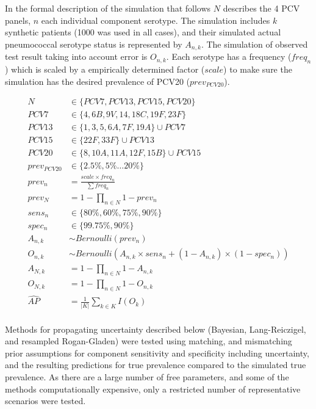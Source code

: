 \documentclass[a4paper, 12pt, twoside]{article}
\begin{document}
In the formal description of the simulation that follows \(N\) describes the 4 PCV panels, \(n\) each individual component serotype. The simulation includes \(k\) synthetic patients (1000 was used in all cases), and their simulated actual pneumococcal serotype status is represented by \(A_{n,k}\). The simulation of observed test result taking into account error is \(O_{n,k}\). Each serotype has a frequency (\(freq_n\)) which is scaled by a empirically determined factor (\(scale\)) to make sure the simulation has the desired prevalence of PCV20 (\(prev_{PCV20}\)).

\begin{equation*}
\begin{aligned}
N &\in \{PCV7, PCV13, PCV15, PCV20\} \\
PCV7 &\in \{4, 6B, 9V, 14, 18C, 19F, 23F\} \\
PCV13 &\in \{1, 3, 5, 6A, 7F, 19A\} \cup PCV7 \\
PCV15 &\in \{22F, 33F\} \cup PCV13\\
PCV20 &\in \{8, 10A, 11A, 12F, 15B\} \cup PCV15\\
prev_{PCV20} &\in \{2.5\%, 5\% \dots 20\% \}  \\
prev_n &= \frac{scale \times freq_n}{\sum{freq_n}} \\
prev_N &= 1-\prod_{n \in N}{1-prev_n} \\
sens_n &\in \{80\%, 60\%, 75\%, 90\% \}  \\
spec_n &\in \{99.75\%,90\% \} \\
A_{n,k} &\sim Bernoulli(prev_n) \\
O_{n,k} &\sim Bernoulli(A_{n,k} \times sens_n + (1-A_{n,k}) \times (1-spec_n)) \\
A_{N,k} &= 1-\prod_{n \in N}{1-A_{n,k}} \\
O_{N,k} &= 1-\prod_{n \in N}{1-O_{n,k}} \\
\widehat{AP} &= \frac{1}{|K|}\sum_{k \in K}{I(O_{k})} \\
\end{aligned}
\end{equation*}

Methods for propagating uncertainty described below (Bayesian, Lang-Reiczigel, and resampled Rogan-Gladen) were tested using matching, and mismatching prior assumptions for component sensitivity and specificity including uncertainty, and the resulting predictions for true prevalence compared to the simulated true prevalence. As there are a large number of free parameters, and some of the methods computationally expensive, only a restricted number of representative scenarios were tested.
\end{document}
